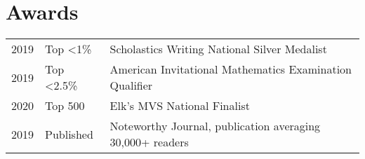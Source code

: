 \documentclass[]{deedy-resume-openfont}
\begin{document}
\begin{minipage}[t]{0.69\textwidth}

\section{Awards} 
\begin{tabular}{rll}
2019	     &  Top <1\%   & Scholastics Writing National Silver Medalist  \\
2019	     &  Top <2.5\%  & American Invitational Mathematics Examination Qualifier \\
2020	     &  Top 500   & Elk's MVS National Finalist \\
2019     & Published
& Noteworthy Journal, publication averaging 30,000+ readers  \\
\end{tabular}
\sectionsep

\end{minipage} 
\end{document}
